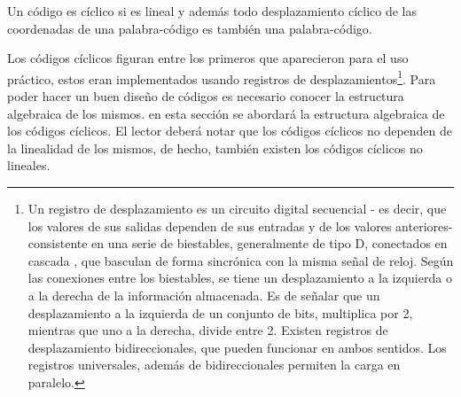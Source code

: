 \begin{definicion}
Un código es cíclico si es lineal y además todo desplazamiento cíclico de las coordenadas de una palabra-código es también una palabra-código. 
\end{definicion}
Los códigos cíclicos figuran entre los primeros que aparecieron para el uso práctico, estos eran implementados usando registros de desplazamientos\footnote{Un registro de desplazamiento es un circuito digital secuencial - es decir, que los valores de sus salidas dependen de sus entradas y de los valores anteriores-  consistente en una serie de biestables, generalmente de tipo D, conectados en cascada , que basculan de forma sincrónica con la misma señal de reloj. Según las conexiones entre los biestables, se tiene un desplazamiento a la izquierda o a la derecha de la información almacenada. Es de señalar que un desplazamiento a la izquierda de un conjunto de bits, multiplica por 2, mientras que uno a la derecha, divide entre 2. Existen registros de desplazamiento bidireccionales, que pueden funcionar en ambos sentidos. Los registros universales, además de bidireccionales permiten la carga en paralelo.}. 
Para poder hacer un buen diseño de códigos es necesario conocer la estructura algebraica de los mismos. en esta sección se abordará la estructura algebraica de los códigos cíclicos.
El lector deberá notar que los códigos cíclicos no dependen de la linealidad de los mismos, de hecho, también existen los códigos cíclicos no lineales.

